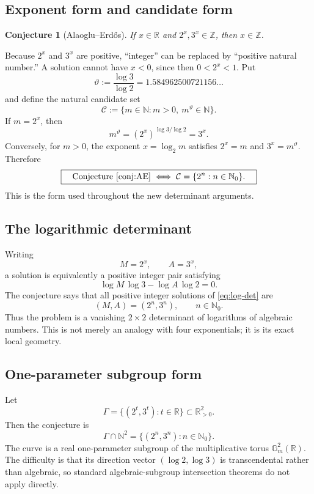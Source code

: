 \documentclass[11pt,oneside]{article}
\newtheorem{conjecture}[theorem]{Conjecture}
\theoremstyle{definition}
\theoremstyle{remark}
\newcommand{\N}{\mathbb N}
\newcommand{\Nzero}{\mathbb N_0}
\newcommand{\Z}{\mathbb Z}
\newcommand{\R}{\mathbb R}
\newcommand{\thetaq}{\vartheta}
\newcommand{\Cand}{\mathcal C}
\begin{document}
\subsection{Exponent form and candidate form}

\begin{conjecture}[Alaoglu--Erd\H{o}s]
\label{conj:AE}
If $x\in\R$ and $2^x,3^x\in\Z$, then $x\in\Z$.
\end{conjecture}

Because $2^x$ and $3^x$ are positive, ``integer'' can be replaced by ``positive natural
number.''  A solution cannot have $x<0$, since then $0<2^x<1$.  Put
\[
  \thetaq:=\frac{\log3}{\log2}=1.584962500721156\ldots
\]
and define the natural candidate set
\[
  \Cand:=\{m\in\N:m>0,\ m^{\thetaq}\in\N\}.
\]
If $m=2^x$, then
\[
  m^{\thetaq}=(2^x)^{\log3/\log2}=3^x.
\]
Conversely, for $m>0$, the exponent $x=\log_2m$ satisfies $2^x=m$ and
$3^x=m^{\thetaq}$.  Therefore
\begin{equation}
 \boxed{\quad\text{Conjecture~\ref{conj:AE}}
 \iff \Cand=\{2^n:n\in\Nzero\}.\quad}
 \label{eq:candidate-equivalence}
\end{equation}
This is the form used throughout the new determinant arguments.

\subsection{The logarithmic determinant}

Writing
\[
  M=2^x,\qquad A=3^x,
\]
a solution is equivalently a positive integer pair satisfying
\begin{equation}
  \log M\,\log3-\log A\,\log2=0.
  \label{eq:log-det}
\end{equation}
The conjecture says that all positive integer solutions of \eqref{eq:log-det} are
\[
  (M,A)=(2^n,3^n),\qquad n\in\Nzero.
\]
Thus the problem is a vanishing $2\times2$ determinant of logarithms of algebraic numbers.
This is not merely an analogy with four exponentials; it is its exact local geometry.

\subsection{One-parameter subgroup form}

Let
\[
  \Gamma=\{(2^t,3^t):t\in\R\}\subset\R_{>0}^2.
\]
Then the conjecture is
\[
  \Gamma\cap\N^2=\{(2^n,3^n):n\in\Nzero\}.
\]
The curve is a real one-parameter subgroup of the multiplicative torus
$\mathbb G_m^2(\R)$.  The difficulty is that its direction vector
$(\log2,\log3)$ is transcendental rather than algebraic, so standard algebraic-subgroup
intersection theorems do not apply directly.
\end{document}
